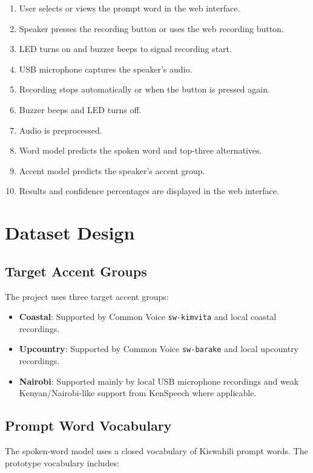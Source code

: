 \documentclass[12pt,a4paper]{report}
\begin{document}
\begin{enumerate}
    \item User selects or views the prompt word in the web interface.
    \item Speaker presses the recording button or uses the web recording button.
    \item LED turns on and buzzer beeps to signal recording start.
    \item USB microphone captures the speaker's audio.
    \item Recording stops automatically or when the button is pressed again.
    \item Buzzer beeps and LED turns off.
    \item Audio is preprocessed.
    \item Word model predicts the spoken word and top-three alternatives.
    \item Accent model predicts the speaker's accent group.
    \item Results and confidence percentages are displayed in the web interface.
\end{enumerate}

\chapter{Dataset Design}

\section{Target Accent Groups}
The project uses three target accent groups:

\begin{itemize}
    \item \textbf{Coastal}: Supported by Common Voice \texttt{sw-kimvita} and local coastal recordings.
    \item \textbf{Upcountry}: Supported by Common Voice \texttt{sw-barake} and local upcountry recordings.
    \item \textbf{Nairobi}: Supported mainly by local USB microphone recordings and weak Kenyan/Nairobi-like support from KenSpeech where applicable.
\end{itemize}

\section{Prompt Word Vocabulary}
The spoken-word model uses a closed vocabulary of Kiswahili prompt words. The prototype vocabulary includes:
\end{document}
